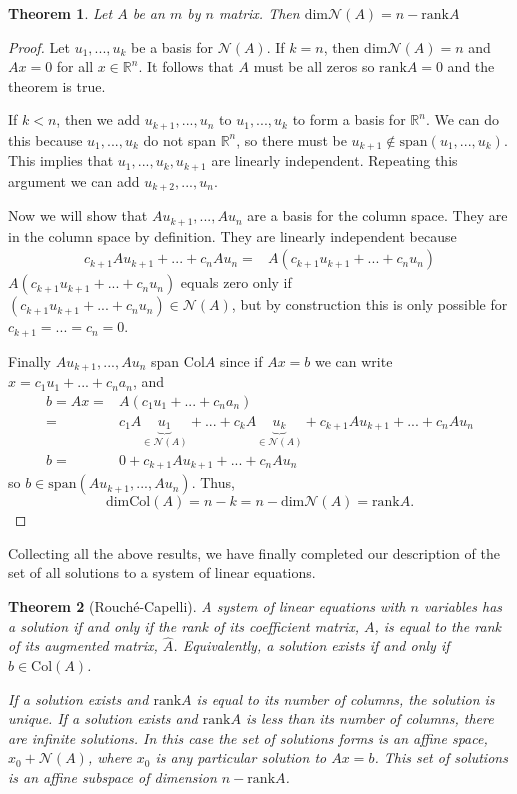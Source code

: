 \documentclass[12pt,reqno]{amsart}
\newtheorem{theorem}{Theorem}[section]
\theoremstyle{definition}
\def\R{\mathbb{R}}
\newcommand{\rank}{\mathrm{rank}}
\newcommand{\spn}{\mathrm{span}}
\newcommand{\col}{\mathrm{Col}}
\renewcommand{\dim}{\mathrm{dim}}
\begin{document}
\begin{theorem}
  Let $A$ be an $m$ by $n$ matrix. Then 
  $\dim \mathcal{N}(A) = n - \rank A$
\end{theorem}
\begin{proof}
  Let $u_1, ..., u_k$ be a basis for $\mathcal{N}(A)$. If $k=n$, then
  $\dim \mathcal{N}(A) = n$ and $A x = 0$ for all $x \in \R^n$. It
  follows that $A$ must be all zeros so $\rank A = 0$ and the theorem
  is true. 

  If $k < n$, then we add $u_{k+1},...,u_n$ to $u_1, ..., u_k$ to form
  a basis for $\R^n$. We can do this because $u_1, ..., u_k$
  do not span $\R^n$, so there must be $u_{k+1} \not\in \spn(u_1, ...,
  u_k)$. This implies that $u_1, ..., u_k, u_{k+1}$ are linearly
  independent. Repeating this argument we can add $u_{k+2}, ...,
  u_n$. 

  Now we will show that  $A u_{k+1}, ..., A u_n$ are a basis for the
  column space. They are in the column space by definition. They are
  linearly independent because
  \begin{align*}
    c_{k+1} A u_{k+1} + ... + c_n A u_{n} = & A (c_{k+1} u_{k+1} +
    ... + c_n u_{n}) 
  \end{align*}
  $A (c_{k+1} u_{k+1} + ... + c_n u_{n})$ equals zero only if $ (c_{k+1} u_{k+1} +
  ... + c_n u_{n}) \in \mathcal{N}(A)$, but by construction this is
  only possible for $c_{k+1} =  ... = c_n = 0$.  

  Finally $A u_{k+1}, ..., A u_n$ span $\col A$ since if $A x = b$ we
  can write $x = c_1 u_1 + ... + c_n a _n$, and
  \begin{align*}
    b = A x = & A \left( c_1 u_1 + ... + c_n a_n \right) \\
    = & c_1 A \underbrace{u_1}_{\in \mathcal{N}(A)} + ... + c_k A
    \underbrace{u_k}_{\in \mathcal{N}(A)} + 
    c_{k+1}Au_{k+1} + ... +c_n A u_n \\
    b = & 0  +     c_{k+1}Au_{k+1} + ... +c_n A u_n 
  \end{align*}
  so $b \in \spn (A u_{k+1}, ..., A u_n )$. Thus, 
  \[ \dim \col(A) = n-k = n - \dim \mathcal{N}(A) = \rank A. \]
\end{proof}

Collecting all the above results, we have finally completed our
description of the set of all solutions to a system of linear
equations. 
\begin{theorem}[Rouch\'{e}-Capelli] \label{thm:rc} A system of linear
  equations with $n$ variables has a solution if and only if the rank
  of its coefficient matrix, $A$, is equal to the rank of its
  augmented matrix, $\hat{A}$. Equivalently, a solution exists if and
  only if $b \in \col(A)$.

  If a solution exists and $\rank A$ is equal to its number of
  columns, the solution is unique. If a solution exists and $\rank A$
  is less than its number of columns, there are infinite solutions. In
  this case the set of solutions forms is an affine space, $x_0 +
  \mathcal{N}(A)$, where $x_0$ is any particular solution to $A x =
  b$. This set of solutions is an affine subspace of dimension $n -
  \rank A$.
\end{theorem}
\end{document}

